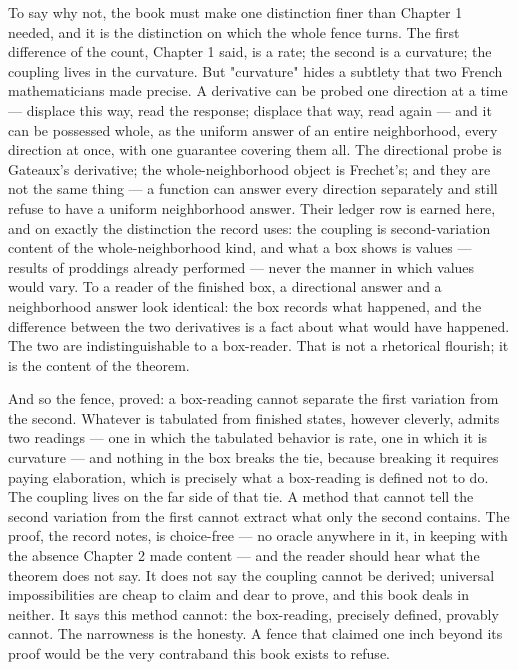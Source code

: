 To say why not, the book must make one distinction finer than Chapter 1 needed, and
it is the distinction on which the whole fence turns. The first difference of the
count, Chapter 1 said, is a rate; the second is a curvature; the coupling lives in
the curvature. But "curvature" hides a subtlety that two French mathematicians made
precise. A derivative can be probed one direction at a time --- displace this way,
read the response; displace that way, read again --- and it can be possessed whole,
as the uniform answer of an entire neighborhood, every direction at once, with one
guarantee covering them all. The directional probe is Gateaux's derivative; the
whole-neighborhood object is Frechet's; and they are not the same thing --- a
function can answer every direction separately and still refuse to have a uniform
neighborhood answer. Their ledger row is earned here, and on exactly the
distinction the record uses: the coupling is second-variation content of the
whole-neighborhood kind, and what a box shows is values --- results of proddings
already performed --- never the manner in which values would vary. To a reader of
the finished box, a directional answer and a neighborhood answer look identical:
the box records what happened, and the difference between the two derivatives is a
fact about what would have happened. The two are indistinguishable to a box-reader.
That is not a rhetorical flourish; it is the content of the theorem.

And so the fence, proved: a box-reading cannot separate the first variation from
the second. Whatever is tabulated from finished states, however cleverly, admits
two readings --- one in which the tabulated behavior is rate, one in which it is
curvature --- and nothing in the box breaks the tie, because breaking it requires
paying elaboration, which is precisely what a box-reading is defined not to do.
The coupling lives on the far side of that tie. A method that cannot tell the
second variation from the first cannot extract what only the second contains. The
proof, the record notes, is choice-free --- no oracle anywhere in it, in keeping
with the absence Chapter 2 made content --- and the reader should hear what the
theorem does not say. It does not say the coupling cannot be derived; universal
impossibilities are cheap to claim and dear to prove, and this book deals in
neither. It says this method cannot: the box-reading, precisely defined, provably
cannot. The narrowness is the honesty. A fence that claimed one inch beyond its
proof would be the very contraband this book exists to refuse.

